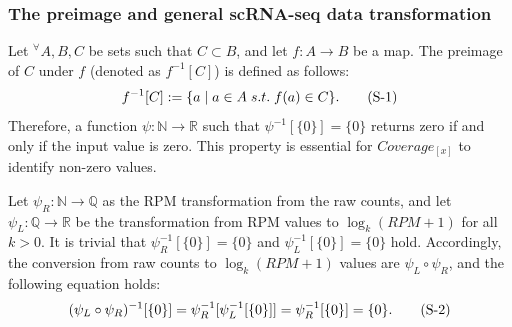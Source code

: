 \documentclass{article}
\begin{document}
\subsubsection*{
  The preimage and general scRNA-seq data transformation
}
Let $^\forall A,B,C$ be sets such that $C\subset B$, and let $f:A\rightarrow B$ be a map. 
The preimage of $C$ under $f$ (denoted as $f^{-1}[C]$) is defined as follows:
\begin{equation}\label{preimage}
  f^{-1}[C]:=\{a\;|\;a\in A\;s.t.\;f(a)\in C\}.
  \stepcounter{equation} \tag{S-\theequation}
\end{equation}
Therefore, a function $\psi: \mathbb{N}\rightarrow\mathbb{R}$ such that $\psi^{-1}[\{0\}]=\{0\}$ returns zero 
if and only if the input value is zero. This property is essential for $Coverage_{[x]}$ to identify non-zero values.

Let $\psi_R:\mathbb{N}\rightarrow \mathbb{Q}$ as the RPM transformation from the raw counts, and let $\psi_L:\mathbb{Q}\rightarrow \mathbb{R}$ be the transformation 
from RPM values to $\log_k(RPM+1)$ for all $k>0$. It is trivial that $\psi_R^{-1}[\{0\}]=\{0\}$ and $\psi_L^{-1}[\{0\}]=\{0\}$ hold.
Accordingly, the conversion from raw counts to $\log_k(RPM+1)$ values are $\psi_L\circ\psi_R$, and the following equation holds:
\begin{equation}\label{raw2logrpm}
  (\psi_L\circ\psi_R)^{-1}[\{0\}]=\psi_R^{-1}[\psi_L^{-1}[\{0\}]]=\psi_R^{-1}[\{0\}]=\{0\}.
  \stepcounter{equation} \tag{S-\theequation}
\end{equation}

\newpage
\end{document}
